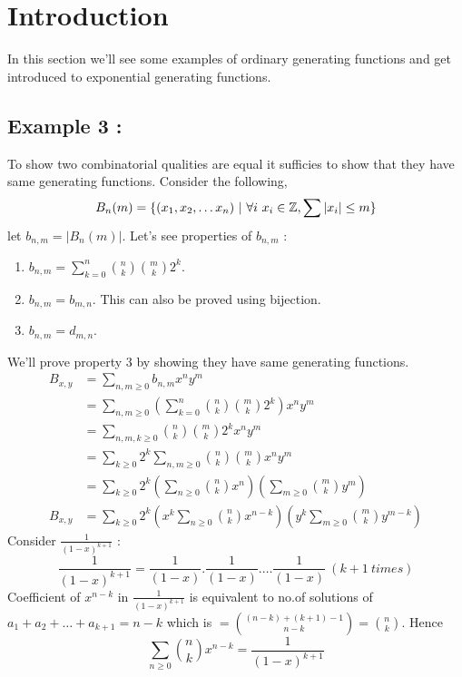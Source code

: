
\section{Introduction}
In this section we'll see some examples of ordinary generating functions and get introduced to exponential generating functions.

\subsection{Example 3 : }
To show two combinatorial qualities are equal it sufficies to show that they have same generating functions. Consider the following,
$$ B_n(m) = \{(x_1, x_2, \dots x_n) ~|~ \forall i ~ x_i \in {\mathbb{Z}} , \sum |x_i| \leq m \}$$
let $b_{n,m} = |B_n(m)|$. Let's see properties of  $b_{n,m}$ :
\begin{enumerate}
    \item $b_{n, m} = \sum_{k=0}^n {n \choose k}{m \choose k} 2^k$.
    \item $b_{n, m} = b_{m, n}$. This can also be proved using bijection.
    \item $b_{n, m} = d_{m, n}$. 
\end{enumerate}
We'll prove property $3$ by showing they have same generating functions.
\begin{align*}
    B_{x,y} &= \sum_{n,m \geq 0} b_{n, m} x^n y^m\\
    &= \sum_{n,m \geq 0} (\sum_{k=0}^n {n \choose k}{m \choose k} 2^k) x^n y^m \\
    &= \sum_{n,m,k \geq 0}{n \choose k}{m \choose k} 2^k x^n y^m \\
    &= \sum_{k \geq 0} 2^k \sum_{n,m \geq 0} {n \choose k}{m \choose k} x^n y^m \\
    &= \sum_{k \geq 0} 2^k (\sum_{n \geq 0} {n \choose k} x^n)(\sum_{m \geq 0} {m \choose k} y^m) \\
B_{x, y}&= \sum_{k \geq 0} 2^k (x^k \sum_{n \geq 0} {n \choose k} x^{n-k})(y^k \sum_{m \geq 0} {m \choose k} y^{m-k})
\end{align*}
Consider $\frac{1}{(1-x)^{k+1}}$ : 
$$\frac{1}{(1-x)^{k+1}} = \frac{1}{(1-x)}.\frac{1}{(1-x)}. \dots \frac{1}{(1-x)} ~(k+1 ~times)$$
Coefficient of $x^{n-k}$ in $\frac{1}{(1-x)^{k+1}}$ is equivalent to no.of solutions of $a_1 + a_2 + \dots + a_{k+1} = n-k$ which is $ = {(n-k) + (k+1) -1 \choose n-k} = {n \choose k}$.
Hence
$$ \sum_{n \geq 0} {n \choose k} x^{n-k} = \frac{1}{(1-x)^{k+1}} $$
